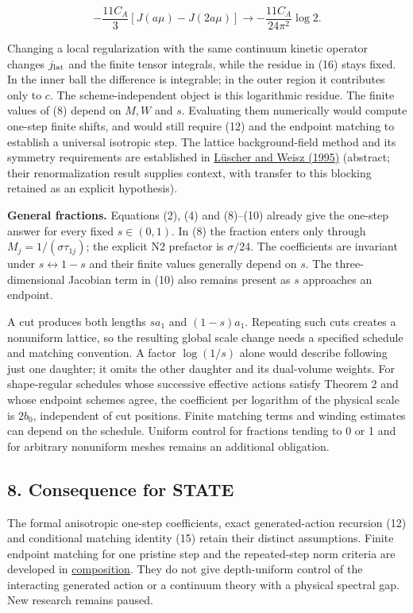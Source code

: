 \documentclass[11pt,a4paper]{article}
\begin{document}
\[-\frac{11C_A}{3}[J(a\mu)-J(2a\mu)]
 \longrightarrow-\frac{11C_A}{24\pi^2}\log2.\tag{18}\]

Changing a local regularization with the same continuum kinetic operator
changes \(j_{\rm lat}\) and the finite tensor integrals, while the
residue in (16) stays fixed. In the inner ball the difference is
integrable; in the outer region it contributes only to \(c\). The
scheme-independent object is this logarithmic residue. The finite values
of (8) depend on \(M,W\) and \(s\). Evaluating them numerically would
compute one-step finite shifts, and would still require (12) and the
endpoint matching to establish a universal isotropic step. The lattice
background-field method and its symmetry requirements are established in
\href{https://arxiv.org/abs/hep-lat/9504006}{Lüscher and Weisz (1995)}
(abstract; their renormalization result supplies context, with transfer
to this blocking retained as an explicit hypothesis).

\textbf{General fractions.} Equations (2), (4) and (8)--(10) already
give the one-step answer for every fixed \(s\in(0,1)\). In (8) the
fraction enters only through \(M_j=1/(\sigma\tau_{1j})\); the explicit
N2 prefactor is \(\sigma/24\). The coefficients are invariant under
\(s\leftrightarrow1-s\) and their finite values generally depend on
\(s\). The three-dimensional Jacobian term in (10) also remains present
as \(s\) approaches an endpoint.

A cut produces both lengths \(sa_1\) and \((1-s)a_1\). Repeating such
cuts creates a nonuniform lattice, so the resulting global scale change
needs a specified schedule and matching convention. A factor
\(\log(1/s)\) alone would describe following just one daughter; it omits
the other daughter and its dual-volume weights. For shape-regular
schedules whose successive effective actions satisfy Theorem 2 and whose
endpoint schemes agree, the coefficient per logarithm of the physical
scale is \(2b_0\), independent of cut positions. Finite matching terms
and winding estimates can depend on the schedule. Uniform control for
fractions tending to 0 or 1 and for arbitrary nonuniform meshes remains
an additional obligation.

\hypertarget{consequence-for-state}{%
\subsection{8. Consequence for STATE}\label{consequence-for-state}}

The formal anisotropic one-step coefficients, exact generated-action
recursion (12) and conditional matching identity (15) retain their
distinct assumptions. Finite endpoint matching for one pristine step and
the repeated-step norm criteria are developed in
\href{four-dimensional-composition.md}{composition}. They do not give
depth-uniform control of the interacting generated action or a continuum
theory with a physical spectral gap. New research remains paused.
\end{document}
